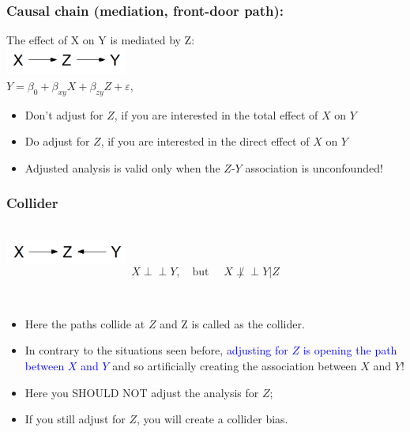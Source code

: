 \documentclass[10pt,dvipsnames,t,handout%
,aspectratio=169%
]{beamer}%
\newcommand{\indep}{\perp\!\!\!\!\perp}
\newcommand{\sini}[1]{\textcolor{Blue}{#1}}
\newcommand{\puna}[1]{\textcolor{BrickRed}{#1}}
\begin{document}
\begin{frame}
	\frametitle{Causal chain (mediation, front-door path):}
	The effect of X on Y is \alert{mediated} by  Z:   \\[0.5cm]
	\includegraphics[width=4cm]{chain}\\[0.5cm]
	
	$Y = \beta_0 +  \beta_{xy} X + \beta_{zy} Z + \varepsilon $, \\[0.3cm]
	
	\pause
	\begin{itemize}
		\item 
		\alert{Don't adjust for $Z$},  if you are interested in the \alert{total effect} of $X$ on $Y$  
		\item \alert{Do adjust for $Z$},  if you are interested in the \alert{direct effect} of $X$ on $Y$ 
		\item Adjusted analysis is valid only when the $Z$-$Y$ association is unconfounded! 
	\end{itemize}
\end{frame}



\begin{frame}
	\frametitle{Collider}
	\mbox{ }\\
	\includegraphics[width=4cm]{collider}\\[0.3cm]
	$$X \indep Y, \quad \text{but } \quad  
	X \not\indep Y|Z$$
	
	\begin{block}{ }\mbox{ }\\
				\begin{itemize}
			\item Here the paths \puna{collide} at $Z$ and Z is called as the \puna{collider}.
			\item In contrary to the situations seen before, \sini{adjusting for $Z$ is  opening the path between $X$ and $Y$} and so 
			 artificially creating the association between $X$ and $Y$!
	\item Here you \puna{SHOULD NOT} adjust the analysis for $Z$;
	\item If you still adjust for $Z$, you will create a \puna{collider bias}.
			\end{itemize}
		\end{block}
\end{frame}
\end{document}
